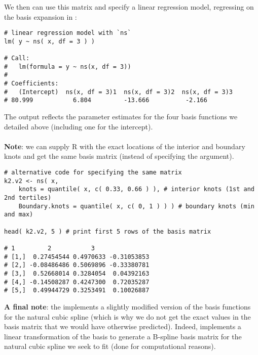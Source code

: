 \documentclass{article}
\begin{document}
\noindent We then can use this matrix and specify a linear regression model, regressing  {} on the basis expansion in  {}:

 \vspace{0.5cm}
 
\begin{lstlisting}
# linear regression model with `ns`
lm( y ~ ns( x, df = 3 ) )

# Call:
#   lm(formula = y ~ ns(x, df = 3))
# 
# Coefficients:
#   (Intercept)  ns(x, df = 3)1  ns(x, df = 3)2  ns(x, df = 3)3  
# 80.999           6.804         -13.666          -2.166  

\end{lstlisting}

 \vspace{0.5cm}
\noindent The output reflects the parameter estimates for the four basis functions we detailed above (including one for the intercept).\\
\\
\noindent \textbf{Note}: we can supply R with the exact locations of the interior and boundary knots and get the same basis matrix (instead of specifying the  {} argument).

\vspace{0.5cm}
 
\begin{lstlisting}
# alternative code for specifying the same matrix
k2.v2 <- ns( x, 
    knots = quantile( x, c( 0.33, 0.66 ) ), # interior knots (1st and 2nd tertiles)
    Boundary.knots = quantile( x, c( 0, 1 ) ) ) # boundary knots (min and max)

head( k2.v2, 5 ) # print first 5 rows of the basis matrix

# 1         2           3
# [1,]  0.27454544 0.4970633 -0.31053853
# [2,] -0.08486486 0.5069896 -0.33380781
# [3,]  0.52668014 0.3284054  0.04392163
# [4,] -0.14508287 0.4247300  0.72035287
# [5,]  0.49944729 0.3253491  0.10026887
\end{lstlisting}

\noindent \textbf{A final note}: the {} implements a slightly modified version of the basis functions for the natural cubic spline (which is why we do not get the exact values in the basis matrix that we would have otherwise predicted). Indeed, {} implements a linear transformation of the basis to generate a B-spline basis matrix for the natural cubic spline we seek to fit (done for computational reasons).

\printbibliography[title={References}]
\end{document}

